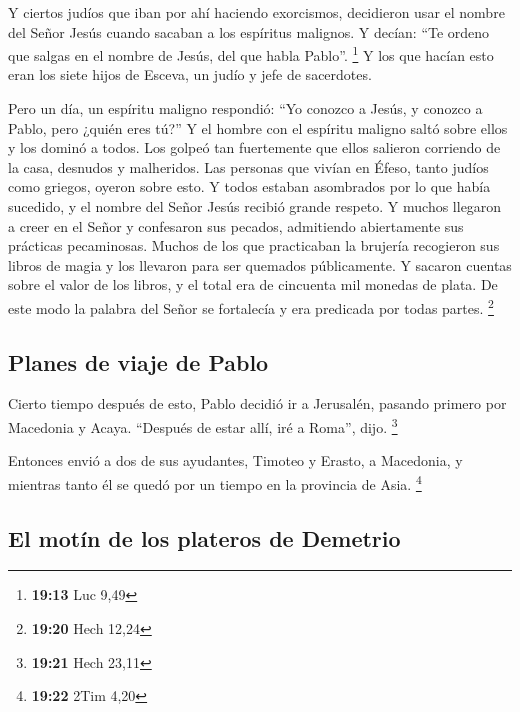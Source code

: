  Y ciertos judíos que iban por ahí haciendo exorcismos,
decidieron usar el nombre del Señor Jesús cuando sacaban a los espíritus
malignos. Y decían: ``Te ordeno que salgas en el nombre de Jesús, del
que habla Pablo''. \footnote{\textbf{19:13} Luc 9,49}  Y
los que hacían esto eran los siete hijos de Esceva, un judío y jefe de
sacerdotes.

 Pero un día, un espíritu maligno respondió: ``Yo conozco
a Jesús, y conozco a Pablo, pero ¿quién eres tú?''  Y el
hombre con el espíritu maligno saltó sobre ellos y los dominó a todos.
Los golpeó tan fuertemente que ellos salieron corriendo de la casa,
desnudos y malheridos.  Las personas que vivían en Éfeso,
tanto judíos como griegos, oyeron sobre esto. Y todos estaban asombrados
por lo que había sucedido, y el nombre del Señor Jesús recibió grande
respeto.  Y muchos llegaron a creer en el Señor y
confesaron sus pecados, admitiendo abiertamente sus prácticas
pecaminosas.  Muchos de los que practicaban la brujería
recogieron sus libros de magia y los llevaron para ser quemados
públicamente. Y sacaron cuentas sobre el valor de los libros, y el total
era de cincuenta mil monedas de plata.  De este modo la
palabra del Señor se fortalecía y era predicada por todas partes.
\footnote{\textbf{19:20} Hech 12,24}

\hypertarget{planes-de-viaje-de-pablo}{%
\subsection{Planes de viaje de Pablo}\label{planes-de-viaje-de-pablo}}

 Cierto tiempo después de esto, Pablo decidió ir a
Jerusalén, pasando primero por Macedonia y Acaya. ``Después de estar
allí, iré a Roma'', dijo. \footnote{\textbf{19:21} Hech 23,11}

 Entonces envió a dos de sus ayudantes, Timoteo y Erasto,
a Macedonia, y mientras tanto él se quedó por un tiempo en la provincia
de Asia. \footnote{\textbf{19:22} 2Tim 4,20}

\hypertarget{el-motuxedn-de-los-plateros-de-demetrio}{%
\subsection{El motín de los plateros de
Demetrio}\label{el-motuxedn-de-los-plateros-de-demetrio}}


